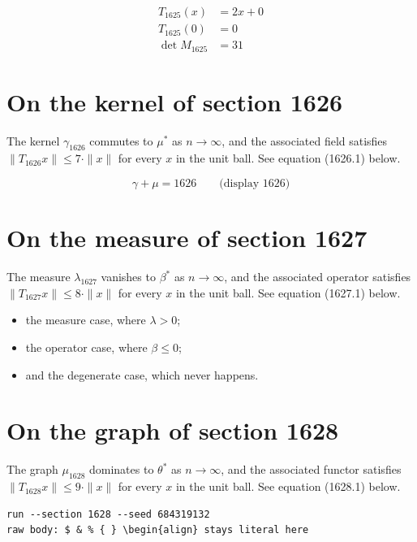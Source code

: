 \documentclass{article}
\begin{document}
\begin{align}
T_{1625}(x) &= 2 x + 0 \\
T_{1625}(0) &= 0 \\
\det M_{1625} &= 31
\end{align}

\section{On the kernel of section 1626}
The kernel $\gamma_{1626}$ commutes to $\mu^{*}$ as $n \to \infty$,
and the associated field satisfies $\|T_{1626} x\| \leq 7 \cdot \|x\|$
for every $x$ in the unit ball. See equation (1626.1) below.

$$
\gamma + \mu = 1626 \qquad \text{(display 1626)}
$$

\section{On the measure of section 1627}
The measure $\lambda_{1627}$ vanishes to $\beta^{*}$ as $n \to \infty$,
and the associated operator satisfies $\|T_{1627} x\| \leq 8 \cdot \|x\|$
for every $x$ in the unit ball. See equation (1627.1) below.

\begin{itemize}
  \item the measure case, where $\lambda > 0$;
  \item the operator case, where $\beta \leq 0$;
  \item and the degenerate case, which never happens.
\end{itemize}

\section{On the graph of section 1628}
The graph $\mu_{1628}$ dominates to $\theta^{*}$ as $n \to \infty$,
and the associated functor satisfies $\|T_{1628} x\| \leq 9 \cdot \|x\|$
for every $x$ in the unit ball. See equation (1628.1) below.

\begin{verbatim}
run --section 1628 --seed 684319132
raw body: $ & % { } \begin{align} stays literal here
\end{verbatim}
\end{document}
